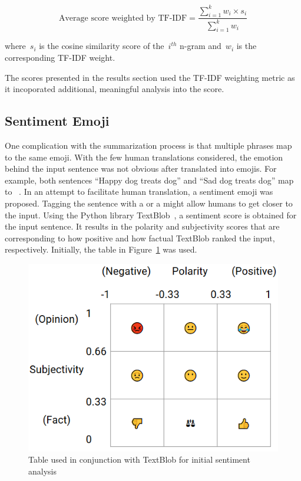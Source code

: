 \documentclass{article}[10]
\newcommand*{\img}[1]{%
  \raisebox{-.3\baselineskip}{%
    \texttt{[image: \#1]}%
  }%
}
\begin{document}
\begin{equation}
  \textrm{Average score weighted by
    TF-IDF} = \frac{\sum_{i=1}^{k}w_{i}\times s_i}{\sum_{i=1}^{k}w_{i}}\label{eq:averageTF-IDFScore}
\end{equation}

where~\(s_{i}\) is the cosine similarity score of
the~\(i^{th}\) n-gram and~\(w_{i}\) is the
corresponding TF-IDF weight.

The scores presented in the results section used the TF-IDF weighting
metric as it incoporated additional, meaningful analysis into the
score.

\subsection{Sentiment Emoji\label{sec:sentimentEmoji}}

One complication with the summarization process is that multiple phrases
map to the same emoji. With the few human translations considered, the
emotion behind the input sentence was not obvious after translated into
emojis. For example, both sentences ``Happy dog treats dog'' and ``Sad
dog treats dog'' map to~\img{emojis/1f415.png}\img{emojis/1f368.png}\img{emojis/1f415.png}. In an attempt to facilitate human
translation, a sentiment emoji was proposed. Tagging the sentence with a
\img{emojis/1f60a.png} or a \img{emojis/1f641.png} might allow humans to get closer to the input. Using the Python
library TextBlob~\cite{TextBlob}, a sentiment score is obtained for
the input sentence. It results in the polarity and subjectivity scores
that are corresponding to how positive and how factual TextBlob ranked
the input, respectively. Initially, the table in
Figure~\ref{fig:sentimentTable} was used.

\begin{figure}[H]
  \begin{center}
    \includegraphics[width=0.90\columnwidth]{figures/sentiment_table1.png}
    \caption{Table used in conjunction with TextBlob for initial sentiment
      analysis\label{fig:sentimentTable}}
  \end{center}
\end{figure}
\end{document}
